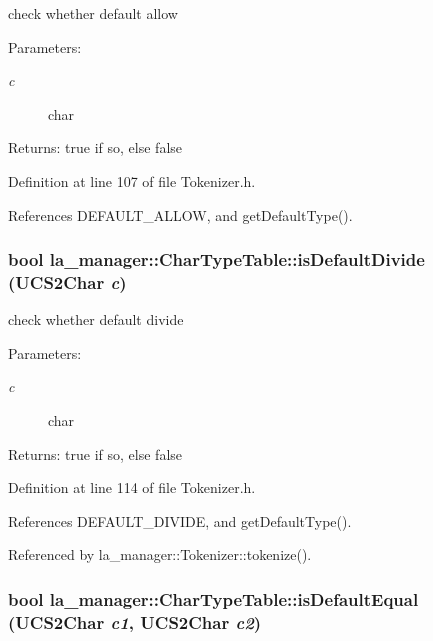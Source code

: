 check whether default allow 

\begin{Desc}
\item[Parameters:]
\begin{description}
\item[{\em c}]char \end{description}
\end{Desc}
\begin{Desc}
\item[Returns:]true if so, else false \end{Desc}


Definition at line 107 of file Tokenizer.h.

References DEFAULT\_\-ALLOW, and getDefaultType().\hypertarget{classla__manager_1_1CharTypeTable_8d9a80838209b03f1003a4e0e6157011}{
\subsubsection[{isDefaultDivide}]{\setlength{\rightskip}{0pt plus 5cm}bool la\_\-manager::CharTypeTable::isDefaultDivide (UCS2Char {\em c})}}
\label{classla__manager_1_1CharTypeTable_8d9a80838209b03f1003a4e0e6157011}


check whether default divide 

\begin{Desc}
\item[Parameters:]
\begin{description}
\item[{\em c}]char \end{description}
\end{Desc}
\begin{Desc}
\item[Returns:]true if so, else false \end{Desc}


Definition at line 114 of file Tokenizer.h.

References DEFAULT\_\-DIVIDE, and getDefaultType().

Referenced by la\_\-manager::Tokenizer::tokenize().\hypertarget{classla__manager_1_1CharTypeTable_98b7aabf9aad40b466d02a3caa023c6c}{
\subsubsection[{isDefaultEqual}]{\setlength{\rightskip}{0pt plus 5cm}bool la\_\-manager::CharTypeTable::isDefaultEqual (UCS2Char {\em c1}, \/  UCS2Char {\em c2})}}
\label{classla__manager_1_1CharTypeTable_98b7aabf9aad40b466d02a3caa023c6c}


